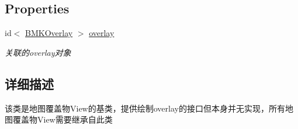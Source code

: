 \subsection*{Properties}
\begin{DoxyCompactItemize}
\item 
\hypertarget{interface_b_m_k_overlay_view_a0824b78460b0c199376680c7c335d562}{id$<$ \hyperlink{protocol_b_m_k_overlay-p}{B\-M\-K\-Overlay} $>$ \hyperlink{interface_b_m_k_overlay_view_a0824b78460b0c199376680c7c335d562}{overlay}}\label{interface_b_m_k_overlay_view_a0824b78460b0c199376680c7c335d562}

\begin{DoxyCompactList}\small\item\em 关联的overlay对象 \end{DoxyCompactList}\end{DoxyCompactItemize}


\subsection{详细描述}
该类是地图覆盖物\-View的基类，提供绘制overlay的接口但本身并无实现，所有地图覆盖物\-View需要继承自此类 

